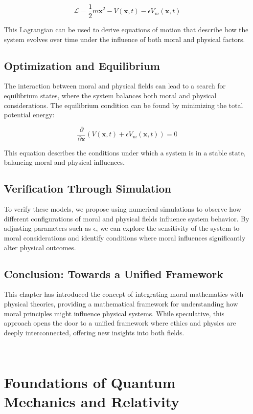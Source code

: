\documentclass{article}
\begin{document}
\[
\mathcal{L} = \frac{1}{2} m \dot{\mathbf{x}}^2 - V(\mathbf{x}, t) - \epsilon V_m(\mathbf{x}, t)
\]

This Lagrangian can be used to derive equations of motion that describe how the system evolves over time under the influence of both moral and physical factors.

\subsection{Optimization and Equilibrium}

The interaction between moral and physical fields can lead to a search for equilibrium states, where the system balances both moral and physical considerations. The equilibrium condition can be found by minimizing the total potential energy:

\[
\frac{\partial}{\partial \mathbf{x}} \left( V(\mathbf{x}, t) + \epsilon V_m(\mathbf{x}, t) \right) = 0
\]

This equation describes the conditions under which a system is in a stable state, balancing moral and physical influences.

\subsection{Verification Through Simulation}

To verify these models, we propose using numerical simulations to observe how different configurations of moral and physical fields influence system behavior. By adjusting parameters such as \( \epsilon \), we can explore the sensitivity of the system to moral considerations and identify conditions where moral influences significantly alter physical outcomes.

\subsection{Conclusion: Towards a Unified Framework}

This chapter has introduced the concept of integrating moral mathematics with physical theories, providing a mathematical framework for understanding how moral principles might influence physical systems. While speculative, this approach opens the door to a unified framework where ethics and physics are deeply interconnected, offering new insights into both fields.

\

\section{Foundations of Quantum Mechanics and Relativity}
\end{document}
